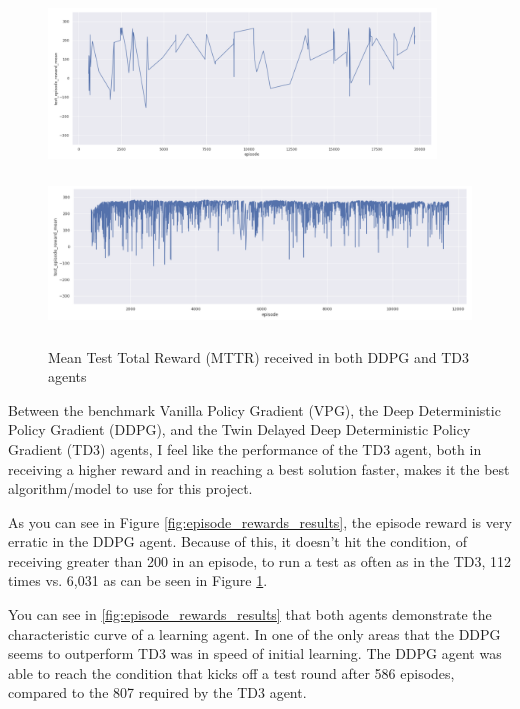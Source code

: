 \documentclass{article}
\begin{document}
\begin{figure}[h]
\caption{Mean Test Total Reward (MTTR) received in both DDPG and TD3 agents}
\centering

\begin{minipage}[t]{.5\linewidth}
\centering
\includegraphics[width=\linewidth, height=4cm]{images/test_episode_reward_mean_ddpg.png}
\label{fig:a}
\end{minipage}%
\begin{minipage}[t]{.5\linewidth}
\centering
\includegraphics[width=\linewidth, height=4cm]{images/test_episode_reward_mean_td3.png}
\label{fig:b}
\end{minipage}

\label{fig:mttr_results}
\end{figure}

Between the benchmark Vanilla Policy Gradient (VPG), the Deep Deterministic Policy Gradient (DDPG), and the Twin Delayed Deep Deterministic Policy Gradient (TD3) agents, I feel like the performance of the TD3 agent, both in receiving a higher reward and in reaching a best solution faster, makes it the best algorithm/model to use for this project.

As you can see in Figure \ref{fig:episode_rewards_results}, the episode reward is very erratic in the DDPG agent. Because of this, it doesn't hit the condition, of receiving greater than 200 in an episode, to run a test as often as in the TD3, 112 times vs. 6,031 as can be seen in Figure \ref{fig:mttr_results}.

You can see in \ref{fig:episode_rewards_results} that both agents demonstrate the characteristic curve of a learning agent. In one of the only areas that the DDPG seems to outperform TD3 was in speed of initial learning. The DDPG agent was able to reach the condition that kicks off a test round after 586 episodes, compared to the 807 required by the TD3 agent. 
\end{document}
